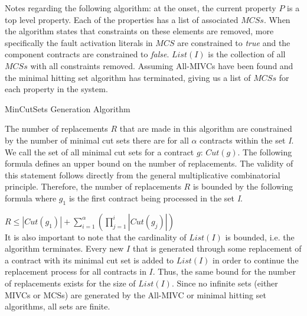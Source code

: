 Notes regarding the following algorithm: at the onset, the current property $P$ is a top level property. Each of the properties has a list of associated $MCSs$. When the algorithm states that constraints on these elements are removed, more specifically the fault activation literals in $MCS$ are constrained to \textit{true} and the component contracts are constrained to \textit{false}. $List(I)$ is the collection of all $MCSs$ with all constraints removed. Assuming All-MIVCs have been found and the minimal hitting set algorithm has terminated, giving us a list of $MCSs$ for each property in the system. 


\begin{algorithm}[h]

	\caption{MinCutSets Generation Algorithm}
	\label{alg:generation_alg}
\end{algorithm}

The number of replacements $R$ that are made in this algorithm are constrained by the number of minimal cut sets there are 
for all $\alpha$ contracts within the set \textit{I}. %
We call the set of all minimal cut sets for a contract $g$: $Cut(g)$. The following formula defines an upper bound on the number of replacements. The validity of this statement follows directly from the general multiplicative combinatorial principle. Therefore, the number of replacements $R$ is bounded by the following formula where $g_1$ is the first contract being processed in the set \textit{I}.

$R \leq |Cut(g_1)| +  {\displaystyle \sum_{i=1}^{\alpha} }({\displaystyle \prod_{j=1}^{i} |Cut(g_j)|})$\\ 

It is also important to note that the cardinality of $List(I)$ is bounded, i.e. the algorithm terminates. Every new $I$ that is generated through some replacement of a contract with its minimal cut set is added to $List(I)$ in order to continue the replacement process for all contracts in $I$. Thus, the same bound for the number of replacements exists for the size of $List(I)$. Since no infinite sets (either MIVCs or MCSs) are generated by the All-MIVC or minimal hitting set algorithms, all sets are finite.

